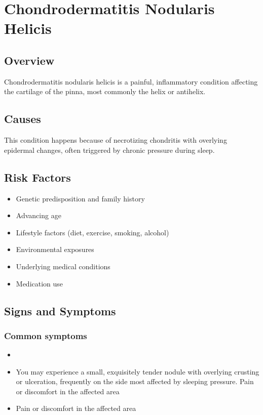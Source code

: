 \chapter{Chondrodermatitis Nodularis Helicis}
\label{sec:Chondrodermatitis Nodularis Helicis}

\section{Overview}
Chondrodermatitis nodularis helicis is a painful, inflammatory condition affecting the cartilage of the pinna, most commonly the helix or antihelix.
\section{Causes}
This condition happens because of necrotizing chondritis with overlying epidermal changes, often triggered by chronic pressure during sleep.     
\section{Risk Factors}

\begin{itemize}[noitemsep]
  \item Genetic predisposition and family history
  \item Advancing age
  \item Lifestyle factors (diet, exercise, smoking, alcohol)
  \item Environmental exposures
  \item Underlying medical conditions
  \item Medication use
\end{itemize}
\section{Signs and Symptoms}

\subsection{Common symptoms}
\begin{itemize}[noitemsep]
  \item \item You may experience a small, exquisitely tender nodule with overlying crusting or ulceration, frequently on the side most affected by sleeping pressure. Pain or discomfort in the affected area    \item Pain or discomfort in the affected area
  \end{itemize}


